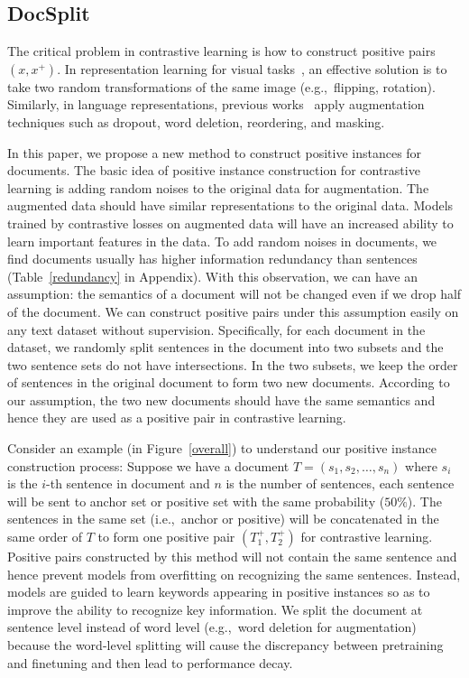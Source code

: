 \documentclass[11pt]{article}
\begin{document}
\subsection{DocSplit}
The critical problem in contrastive learning is how to construct positive pairs $(x, x^{+})$.
In representation learning for visual tasks~\cite{Chen2020ASF}, an effective solution is to take two random transformations of the same image (e.g.,~flipping, rotation).
Similarly, in language representations, previous works~\cite{Gao2021SimCSESC, Karpukhin2020DensePR, Meng2021COCOLMCA, Li2022UCTopicUC} apply augmentation techniques such as dropout, word deletion, reordering, and masking.

In this paper, we propose a new method to construct positive instances for documents. 
The basic idea of positive instance construction for contrastive learning is adding random noises to the original data for augmentation. 
The augmented data should have similar representations to the original data. 
Models trained by contrastive losses on augmented data will have an increased ability to learn important features in the data.
To add random noises in documents, we find documents usually has higher information redundancy than sentences (Table~\ref{redundancy} in Appendix). 
With this observation, we can have an assumption: 
the semantics of a document will not be changed even if we drop half of the document. 
We can construct positive pairs under this assumption easily on any text dataset without supervision.
Specifically, for each document in the dataset, we randomly split sentences in the document into two subsets and the two sentence sets do not have intersections. 
In the two subsets, we keep the order of sentences in the original document to form two new documents. 
According to our assumption, the two new documents should have the same semantics and hence they are used as a positive pair in contrastive learning. 

Consider an example (in Figure~\ref{overall}) to understand our positive instance construction process:
Suppose we have a document $T = (s_1, s_2,\dots,s_n)$ where $s_i$ is the $i$-th sentence in document and $n$ is the number of sentences, each sentence will be sent to anchor set or positive set with the same probability ($50\%$). 
The sentences in the same set (i.e.,~anchor or positive) will be concatenated in the same order of $T$ to form one positive pair $(T^+_1, T^+_2)$ for contrastive learning. 
Positive pairs constructed by this method will not contain the same sentence and hence prevent models from overfitting on recognizing the same sentences. 
Instead, models are guided to learn keywords appearing in positive instances so as to improve the ability to recognize key information. 
We split the document at sentence level instead of word level (e.g.,~word deletion for augmentation) because the word-level splitting will cause the discrepancy between pretraining and finetuning and then lead to performance decay.
\end{document}
